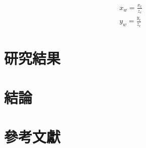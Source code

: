 \documentclass[12pt]{article}       %
\begin{document}
\begin{align}
    x_{w}=\frac{x_{c}}{z_{c}}
    \label{eq:xw}\\
    y_{w}=\frac{y_{c}}{z_{c}}
    \label{eq:yw}
\end{align}



\section{\centering 研究結果}





\section{\centering 結論} 




\section{\centering 參考文獻}
\vspace{-3.5em}  %
\renewcommand{\refname}{}  %
\printbibliography  %
\end{document}
